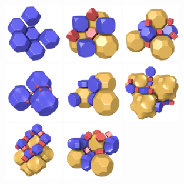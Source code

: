 \documentclass{beamer}
\begin{document}
\begin{frame}
  \begin{center}
    \includegraphics[width=1.0in]{simple1}
    \includegraphics[width=1.0in]{simple2}
    \includegraphics[width=1.0in]{simple3}\\
    \includegraphics[width=1.0in]{simple4}
    \includegraphics[width=1.0in]{simple5}
    \includegraphics[width=1.0in]{simple6}\\
    \includegraphics[width=1.0in]{simple7}
    \includegraphics[width=1.0in]{simple8}

\end{center}
\end{frame}
\end{document}

